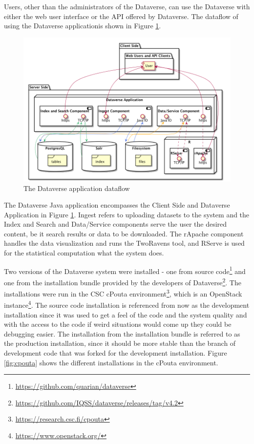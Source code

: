 Users, other than the administrators of the Dataverse, can use the Dataverse
with either the web user interface or the API offered by Dataverse. The
dataflow of using the Dataverse application is shown in Figure
\ref{fig:dataflow}.

\begin{figure}
    \begin{centering}
        \includegraphics[width=\textwidth]{images/dataflow}
    \end{centering}
    \caption[The Dataverse application dataflow]{The Dataverse application dataflow}
    \label{fig:dataflow}
\end{figure}

The Dataverse Java application encompasses the Client Side and Dataverse
Application in Figure \ref{fig:dataflow}. Ingest refers to uploading datasets
to the system and the Index and Search and Data/Service components serve the
user the desired content, be it search results or data to be downloaded. The
rApache component handles the data visualization and runs the TwoRavens tool,
and RServe is used for the statistical computation what the system does.

Two versions of the Dataverse system were installed - one from source
code\footnote{\url{https://github.com/quarian/dataverse}} and one from the
installation bundle provided by the developers of
Dataverse\footnote{\url{https://github.com/IQSS/dataverse/releases/tag/v4.2}}.
The installations were run in the CSC cPouta
environment\footnote{\url{https://research.csc.fi/cpouta}}, which is an
OpenStack instance\footnote{\url{https://www.openstack.org/}}. The source code
installation is referenced from now as the development installation since it
was used to get a feel of the code and the system quality and with the access
to the code if weird situations would come up they could be debugging easier.
The installation from the installation bundle is referred to as the production
installation, since it should be more stable than the branch of development
code that was forked for the development installation. Figure
\ref{fig:cpouta} shows the different installations in the cPouta environment.

